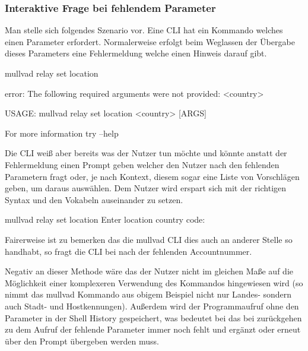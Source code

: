 \documentclass[oneside,bibliography=totocnumbered,BCOR=5mm]{scrbook}
\newenvironment{code}{\captionsetup{type=listing, skip=0pt}}{}
\begin{document}


\subsubsection{Interaktive Frage bei fehlendem Parameter}

Man stelle sich folgendes Szenario vor. Eine CLI hat ein Kommando welches einen Parameter erfordert.
Normalerweise erfolgt beim Weglassen der Übergabe dieses Parameters eine Fehlermeldung welche einen Hinweis darauf gibt.

\begin{code}
  \begin{shellcode}
mullvad relay set location

error: The following required arguments were not provided:
    <country>

USAGE:
    mullvad relay set location <country> [ARGS]

For more information try --help
  \end{shellcode}
  \medskip
\end{code}

Die CLI weiß aber bereits was der Nutzer tun möchte und könnte anstatt der
Fehlermeldung einen Prompt geben welcher den Nutzer nach den fehlenden
Parametern fragt \parencite{12factor} oder, je nach Kontext, diesem sogar eine
Liste von Vorschlägen geben, um daraus auswählen. Dem Nutzer wird erspart sich
mit der richtigen Syntax und den Vokabeln auseinander zu setzen.


\begin{code}
  \begin{shellcode}
mullvad relay set location
Enter location country code:
  \end{shellcode}
  \medskip
\end{code}

Fairerweise ist zu bemerken das die mullvad CLI dies auch an anderer Stelle
so handhabt, so fragt die CLI bei  nach der
fehlenden Accountnummer.

Negativ an dieser Methode wäre das der Nutzer nicht im gleichen Maße auf die
Möglichkeit einer komplexeren Verwendung des Kommandos hingewiesen wird (so
nimmt das mullvad Kommando aus obigem Beispiel nicht nur Landes- sondern auch
Stadt- und Hostkennungen). Außerdem wird der Programmaufruf ohne den Parameter
in der Shell History gespeichert, was bedeutet bei das bei zurückgehen zu dem
Aufruf der fehlende Parameter immer noch fehlt und ergänzt oder erneut über den
Prompt übergeben werden muss. %
\end{document}
